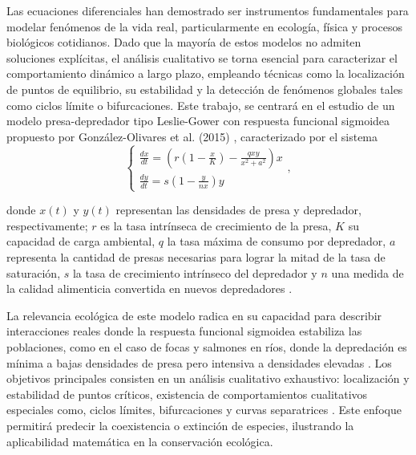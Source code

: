 \documentclass[12pt,letterpaper,oneside]{book}
\theoremstyle{definition}
\theoremstyle{remark}
\begin{document}
	Las ecuaciones diferenciales han demostrado ser instrumentos fundamentales para modelar fenómenos de la vida real, particularmente en ecología, física y procesos biológicos cotidianos. Dado que la mayoría de estos modelos no admiten soluciones explícitas, el análisis cualitativo se torna esencial para caracterizar el comportamiento dinámico a largo plazo, empleando técnicas como la localización de puntos de equilibrio, su estabilidad y la detección de fenómenos globales tales como ciclos límite o bifurcaciones. Este trabajo, se centrará en el estudio de un modelo presa-depredador tipo Leslie-Gower con respuesta funcional sigmoidea propuesto por González-Olivares et al. (2015) \cite{articulo}, caracterizado por el sistema
	\begin{equation*}
		\begin{cases} 
			\frac{dx}{dt} = (r \left(1 - \frac{x}{K}\right) - \frac{q x y}{x^2 + a^2})x \\ 
			\frac{dy}{dt} = s \left(1 - \frac{y}{n x}\right) y
		\end{cases},
	\end{equation*}
	
	donde $x(t)$ y $y(t)$ representan las densidades de presa y depredador, respectivamente; $r$ es la tasa intrínseca de crecimiento de la presa, $K$ su capacidad de carga ambiental, $q$ la tasa máxima de consumo por depredador, $a$ representa la cantidad de presas necesarias para lograr la mitad de la tasa de saturación, $s$ la tasa de crecimiento intrínseco del depredador y $n$ una medida de la calidad alimenticia convertida en nuevos depredadores \cite[p. 1895]{articulo}.
	
	La relevancia ecológica de este modelo radica en su capacidad para describir interacciones reales donde la respuesta funcional sigmoidea estabiliza las poblaciones, como en el caso de focas y salmones en ríos, donde la depredación es mínima a bajas densidades de presa pero intensiva a densidades elevadas \cite[p. 1896]{articulo}. Los objetivos principales consisten en un análisis cualitativo exhaustivo: localización y estabilidad de puntos críticos, existencia de comportamientos cualitativos especiales como, ciclos límites, bifurcaciones y curvas separatrices \cite{articulo}. Este enfoque permitirá predecir la coexistencia o extinción de especies, ilustrando la aplicabilidad matemática en la conservación ecológica.
	
	
\end{document}
